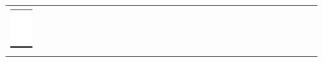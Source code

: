 \documentclass[10pt]{article}
\begin{document}
\begin{center}
\begin{tabular}{|c|c|c|c|c|c|c|c|c|c|c|c|c|c|c|c|c|c|c|c|c|c|c|c|c|c|c|c|c|c|}
 &  &  &  &  &  &  &  &  &  &  &  &  &  &  &  &  &  &  &  &  &  &  &  &  &  &  &  &  &  \\
\hline
\includegraphics[max width=\textwidth]{2024_11_21_dd21f7544b65bcf1b3c7g-14}
 &  &  &  &  &  &  &  &  &  &  &  &  &  &  &  &  &  &  &  &  &  &  &  &  &  &  &  &  &  \\

\end{tabular}
\end{center}
\end{document}
